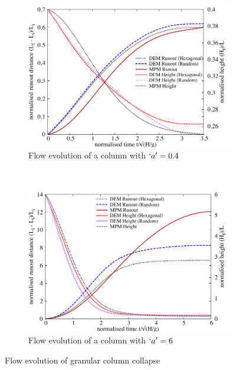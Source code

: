\begin{figure}[tbhp]
\centering
\begin{subfigure}[b]{0.975\textwidth}
\centering
\includegraphics[width=\textwidth]{flowa04}
\caption{Flow evolution of a column with $`a'=0.4$}
\label{fig:flowa04}
\end{subfigure}
\\
\begin{subfigure}[b]{0.975\textwidth}
\centering
\includegraphics[width=\textwidth]{flowa6}
\caption{Flow evolution of a column with $`a'=6$}
\label{fig:flowa6}
\end{subfigure}
\caption{Flow evolution of granular column collapse}
\label{fig:flow_column}
\end{figure}

